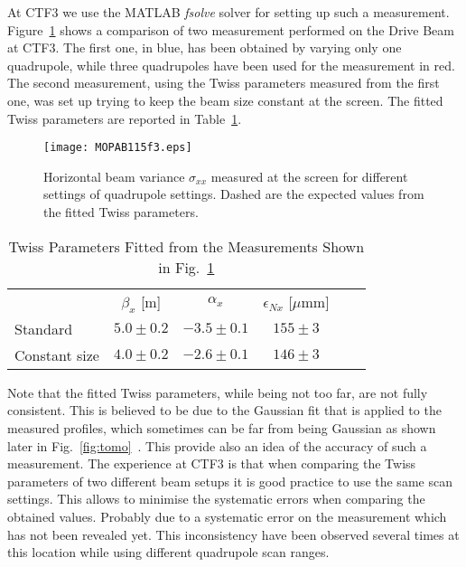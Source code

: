 At CTF3 we use the MATLAB \emph{fsolve} solver \cite{mat:solver} for
setting up such a measurement.
Figure~\ref{fig:constantBeam} shows a comparison of two measurement
performed on the Drive Beam at CTF3.
The first one, in blue, has been obtained by varying only one
quadrupole, while three quadrupoles have been used for the measurement
in red.
The second measurement, using the Twiss parameters measured from the
first one, was set up trying to keep the beam size constant at the
screen.
The fitted Twiss parameters are reported in
Table~\ref{tab:constantBeam}.
%
\begin{figure}[htb]
   \centering
   \texttt{[image: MOPAB115f3.eps]}
   \caption{Horizontal beam variance $\sigma_{xx}$ measured at the screen for different settings of quadrupole settings. Dashed are the expected values from the fitted Twiss parameters.}
   \label{fig:constantBeam}
\end{figure}
%
%
\begin{table}[bt]
   \centering
   \begin{tabular}{ l c c c c c}
    \hline                
                & $\beta_x$ [m]      & $\alpha_x$          & $\epsilon_{Nx}$ [$\mu$mm] \\
  Standard      & $5.0\pm0.2$        & $-3.5\pm0.1$        & $155\pm3$ \\
  Constant size & $4.0\pm0.2$        & $-2.6\pm0.1$        & $146\pm3$ \\
    \hline
   \end{tabular}
   \caption{Twiss Parameters Fitted from the Measurements Shown in Fig.~\ref{fig:constantBeam}}
   \label{tab:constantBeam}
\end{table}
%
Note that the fitted Twiss parameters, while being not too far, are not
fully consistent.
This is believed to be due to the Gaussian fit that is applied to the
measured profiles, which sometimes can be far from being Gaussian as
shown later in Fig.~\ref{fig:tomo}~\protect{}.
This provide also an idea of the accuracy of such a measurement. 
The experience at CTF3 is that when comparing the Twiss parameters of
two different beam setups it is good practice to use the same scan
settings. This allows to minimise the systematic errors when comparing
the obtained values.
Probably due to a systematic error on the measurement which has not
been revealed yet. 
This inconsistency have been observed several times at this location
while using different quadrupole scan ranges.

